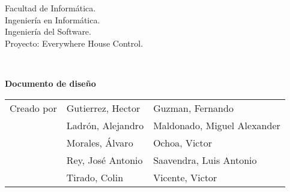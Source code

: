 \begin{titlepage}
    \begin{scriptsize}\noindent Facultad de Informática.\\
        Ingeniería en Informática.\\
        Ingeniería del Software.\\
        Proyecto: Everywhere House Control.
    \end{scriptsize}\\
    \vfill
    \begin{center}
        \begin{Large}
            \textbf{Documento de diseño}
        \end{Large}
    \end{center}
    \vfill
    \begin{flushright}
        \begin{scriptsize}
            \begin{tabular}{lll}
                Creado por & Gutierrez, Hector & Guzman, Fernando\\
                & Ladrón, Alejandro & Maldonado, Miguel Alexander\\
                & Morales, Álvaro & Ochoa, Victor\\
                & Rey, José Antonio & Saavendra, Luis Antonio\\
                & Tirado, Colin & Vicente, Victor\\
            \end{tabular}
        \end{scriptsize}
    \end{flushright}
\end{titlepage}
\thispagestyle{empty}
\cleardoublepage
\newpage

\tableofcontents
\newpage
\thispagestyle{empty}
\cleardoublepage
\newpage
{}
\raggedbottom
{}



